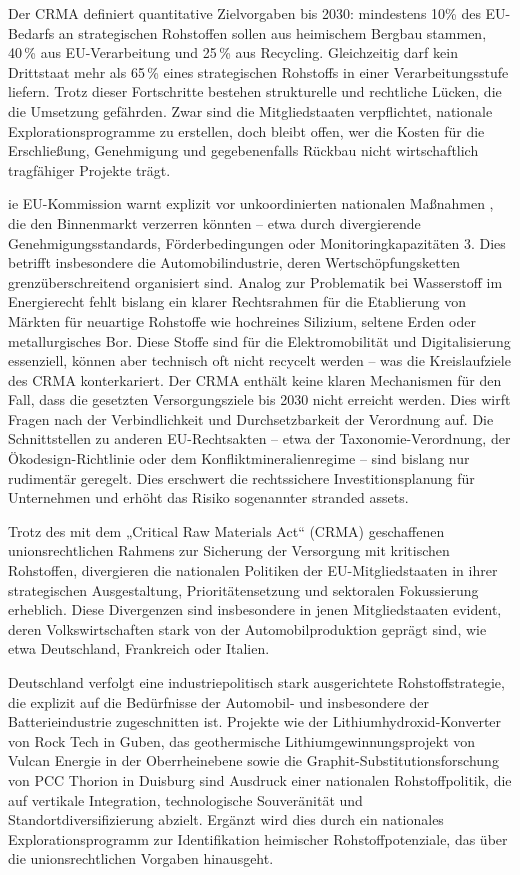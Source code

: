 \documentclass[12pt,a4paper,oneside]{book} %
\begin{document}
	Der CRMA definiert quantitative Zielvorgaben bis 2030: mindestens 10\% des EU-Bedarfs an strategischen Rohstoffen sollen aus heimischem Bergbau stammen, 40 \% aus EU-Verarbeitung und 25 \% aus Recycling. Gleichzeitig darf kein Drittstaat mehr als 65 \% eines strategischen Rohstoffs in einer Verarbeitungsstufe liefern. Trotz dieser Fortschritte bestehen strukturelle und rechtliche Lücken, die die Umsetzung gefährden. Zwar sind die Mitgliedstaaten verpflichtet, nationale Explorationsprogramme zu erstellen, doch bleibt offen, wer die Kosten für die Erschließung, Genehmigung und gegebenenfalls Rückbau nicht wirtschaftlich tragfähiger Projekte trägt.
	
	ie EU-Kommission warnt explizit vor \glqq unkoordinierten nationalen Maßnahmen \grqq, die den Binnenmarkt verzerren könnten – etwa durch divergierende Genehmigungsstandards, Förderbedingungen oder Monitoringkapazitäten 3. Dies betrifft insbesondere die Automobilindustrie, deren Wertschöpfungsketten grenzüberschreitend organisiert sind. Analog zur Problematik bei Wasserstoff im Energierecht fehlt bislang ein klarer Rechtsrahmen für die Etablierung von Märkten für neuartige Rohstoffe wie hochreines Silizium, seltene Erden oder metallurgisches Bor. Diese Stoffe sind für die Elektromobilität und Digitalisierung essenziell, können aber technisch oft nicht recycelt werden – was die Kreislaufziele des CRMA konterkariert. Der CRMA enthält keine klaren Mechanismen für den Fall, dass die gesetzten Versorgungsziele bis 2030 nicht erreicht werden. Dies wirft Fragen nach der Verbindlichkeit und Durchsetzbarkeit der Verordnung auf. Die Schnittstellen zu anderen EU-Rechtsakten – etwa der Taxonomie-Verordnung, der Ökodesign-Richtlinie oder dem Konfliktmineralienregime – sind bislang nur rudimentär geregelt. Dies erschwert die rechtssichere Investitionsplanung für Unternehmen und erhöht das Risiko sogenannter \glqq stranded assets\grqq.
	
Trotz des mit dem „Critical Raw Materials Act“ (CRMA) geschaffenen unionsrechtlichen Rahmens zur Sicherung der Versorgung mit kritischen Rohstoffen, divergieren die nationalen Politiken der EU-Mitgliedstaaten in ihrer strategischen Ausgestaltung, Prioritätensetzung und sektoralen Fokussierung erheblich. Diese Divergenzen sind insbesondere in jenen Mitgliedstaaten evident, deren Volkswirtschaften stark von der Automobilproduktion geprägt sind, wie etwa Deutschland, Frankreich oder Italien.

Deutschland verfolgt eine industriepolitisch stark ausgerichtete Rohstoffstrategie, die explizit auf die Bedürfnisse der Automobil- und insbesondere der Batterieindustrie zugeschnitten ist. Projekte wie der Lithiumhydroxid-Konverter von Rock Tech in Guben, das geothermische Lithiumgewinnungsprojekt von Vulcan Energie in der Oberrheinebene sowie die Graphit-Substitutionsforschung von PCC Thorion in Duisburg sind Ausdruck einer nationalen Rohstoffpolitik, die auf vertikale Integration, technologische Souveränität und Standortdiversifizierung abzielt. Ergänzt wird dies durch ein nationales Explorationsprogramm zur Identifikation heimischer Rohstoffpotenziale, das über die unionsrechtlichen Vorgaben hinausgeht.
\end{document}
